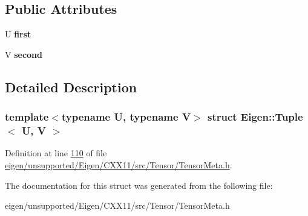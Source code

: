 \subsection*{Public Attributes}
\begin{DoxyCompactItemize}
\item 
\mbox{\label{struct_eigen_1_1_tuple_a6028989eb2e8ac802cc9f727a1c75f14}} 
U {\bfseries first}
\item 
\mbox{\label{struct_eigen_1_1_tuple_a043da22255c1723a9739e3d382b6948f}} 
V {\bfseries second}
\end{DoxyCompactItemize}


\subsection{Detailed Description}
\subsubsection*{template$<$typename U, typename V$>$\newline
struct Eigen\+::\+Tuple$<$ U, V $>$}



Definition at line \hyperlink{eigen_2unsupported_2_eigen_2_c_x_x11_2src_2_tensor_2_tensor_meta_8h_source_l00110}{110} of file \hyperlink{eigen_2unsupported_2_eigen_2_c_x_x11_2src_2_tensor_2_tensor_meta_8h_source}{eigen/unsupported/\+Eigen/\+C\+X\+X11/src/\+Tensor/\+Tensor\+Meta.\+h}.



The documentation for this struct was generated from the following file\+:\begin{DoxyCompactItemize}
\item 
eigen/unsupported/\+Eigen/\+C\+X\+X11/src/\+Tensor/\+Tensor\+Meta.\+h\end{DoxyCompactItemize}

